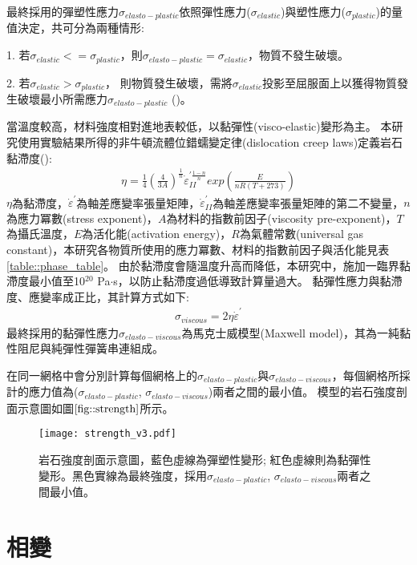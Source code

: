 最終採用的彈塑性應力$\sigma_{elasto-plastic}$依照彈性應力($\sigma_{elastic}$)與塑性應力($\sigma_{plastic}$)的量值決定，共可分為兩種情形:

1. 若$\sigma_{elastic} <= \sigma_{plastic}$，則$ \sigma_{elasto-plastic} = \sigma_{elastic}$，物質不發生破壞。

2. 若$\sigma_{elastic} > \sigma_{plastic}$， 則物質發生破壞，需將$\sigma_{elastic}$投影至屈服面上以獲得物質發生破壞最小所需應力$\sigma_{elasto-plastic}$ (\citealp{simo2006computational})。

當溫度較高，材料強度相對進地表較低，以黏彈性(visco-elastic)變形為主。
本研究使用實驗結果所得的非牛頓流體位錯蠕變定律(dislocation creep laws)定義岩石黏滯度(\citealp{Chen1990}):
\begin{align}
   \eta=\frac{1}{4}(\frac{4}{3A})^{\frac{1}{n}} \dot\varepsilon_{II}^{' \frac{1-n}{n}} exp(\frac{E}{nR(T+273)})
   \label{eqn:viscousity}
\end{align}
$\eta$為黏滯度，$\dot\varepsilon^{'}$為軸差應變率張量矩陣，$\dot\varepsilon_{II}^{'}$為軸差應變率張量矩陣的第二不變量，$n$為應力冪數(stress exponent)，$A$為材料的指數前因子(viscosity pre-exponent)，$T$為攝氏溫度，$E$為活化能(activation energy)，$R$為氣體常數(universal gas constant)，本研究各物質所使用的應力冪數、材料的指數前因子與活化能見表\ref{table::phase_table}。
由於黏滯度會隨溫度升高而降低，本研究中，施加一臨界黏滯度最小值至10$^{20}$ Pa$\cdot$s，以防止黏滯度過低導致計算量過大。
黏彈性應力與黏滯度、應變率成正比，其計算方式如下:
\begin{align}
    \sigma_{viscous} = 2\eta\dot\varepsilon^{'} \label{eqn:viscous tensor}
\end{align}
最終採用的黏彈性應力$\sigma_{elasto-viscous}$為馬克士威模型(Maxwell model)，其為一純黏性阻尼與純彈性彈簧串連組成。

在同一網格中會分別計算每個網格上的$\sigma_{elasto-plastic}$與$\sigma_{elasto-viscous}$，每個網格所採計的應力值為($\sigma_{elasto-plastic}$, $\sigma_{elasto-viscous}$)兩者之間的最小值。
模型的岩石強度剖面示意圖如圖$\ref{fig::strength}$所示。
\begin{figure*}[ht!]
    \centering
    \texttt{[image: strength\_v3.pdf]}
    \caption[岩石強度剖面示意圖]{岩石強度剖面示意圖，藍色虛線為彈塑性變形; 紅色虛線則為黏彈性變形。黑色實線為最終強度，採用$\sigma_{elasto-plastic}$, $\sigma_{elasto-viscous}$兩者之間最小值。}
    \label{fig::strength}
\end{figure*}

\section{相變}\label{相變}

